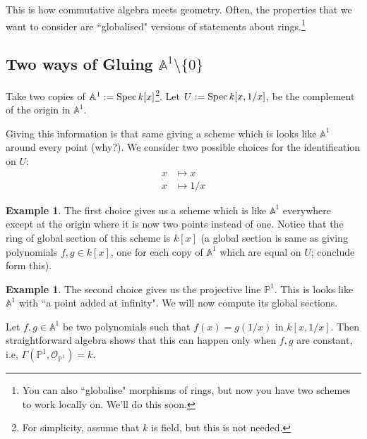 \documentclass[11pt]{amsart}
\newcommand{\Spec}{{\rm Spec \,}}
\newcommand{\sO}{{\mathcal O}}
\newcommand{\A}{{\mathbb A}}
\renewcommand{\P}{{\mathbb P}}
\theoremstyle{definition}
\newtheorem{example}[theorem]{Example}
\begin{document}
This is how commutative algebra meets geometry. Often, the properties that we want to consider are ``globalised" versions of statements about rings.\footnote{You can also ``globalise" morphisms of rings, but now you have two schemes to work locally on. We'll do this soon.}

\subsection{Two ways of Gluing \texorpdfstring{$\A^1\setminus \lbrace 0\rbrace$}{Pn}}

Take two copies of $\A^1:= \Spec k[x]$\footnote{For simplicity, assume that $k$ is field, but this is not needed.}. Let $U:= \Spec k[x,1/x]$, be the complement of the origin in $\A^1$.

\begin{center}
\end{center}

Giving this information is that same giving a scheme which is looks like $\A^1$ around every point (why?). We consider two possible choices for the identification on $U$:
\begin{align*}
x &\mapsto x\\
x &\mapsto 1/x
\end{align*}
\begin{example}
 The first choice gives us a scheme which is like $\A^1$ everywhere except at the origin where it is now two points instead of one. Notice that the ring of global section of this scheme is $k[x]$ (a global section is same as giving polynomials $f, g\in k[x]$, one for each copy of $\A^1$ which are equal on $U$; conclude form this).
\end{example}

\begin{example}
The second choice gives us the projective line $\P^1$. This is looks like $\A^1$ with ``a point added at infinity". We will now compute its global sections.

Let $f,g\in\A^1$ be two polynomials such that $f(x)=g(1/x)$ in $k[x,1/x]$. Then straightforward algebra shows that this can happen only when $f, g$ are constant, i.e, $\Gamma(\P^1,\sO_{\P^1})=k$.
\end{example}
\end{document}
